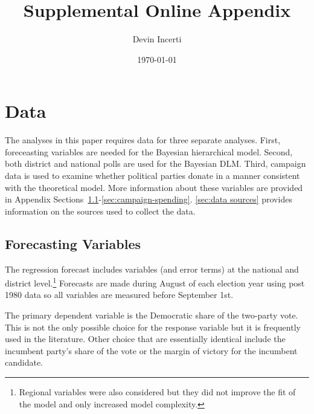 \documentclass[12pt,final,fleqn]{article}
\theoremstyle{plain}
\begin{document}
\author{Devin Incerti}
\title{\textbf{Supplemental Online Appendix}}
\date{\today}
\maketitle

\tableofcontents
\listoffigures
\listoftables

\clearpage
\doublespacing

\section{Data}
The analyses in this paper requires data for three separate analyses. First, foreceasting variables are needed for the Bayesian hierarchical model. Second, both district and national polls are used for the Bayesian DLM. Third, campaign data is used to examine whether political parties donate in a manner consistent with the theoretical model. More information about these variables are provided in Appendix Sections~\ref{sec:forecast-vars}-\ref{sec:campaign-spending}. \autoref{sec:data sources} provides information on the sources used to collect the data.

\subsection{Forecasting Variables} \label{sec:forecast-vars}
The regression forecast includes variables (and error terms) at the national and district level.\footnote{Regional variables were also considered but they did not improve the fit of the model and only increased model complexity.} Forecasts are made during August of each election year using post 1980 data so all variables are measured before September 1st.

The primary dependent variable is the Democratic share of the two-party vote. This is not the only possible choice for the response variable but it is frequently used in the literature. Other choice that are essentially identical include the incumbent party's share of the vote or the margin of victory for the incumbent candidate.
\end{document}
